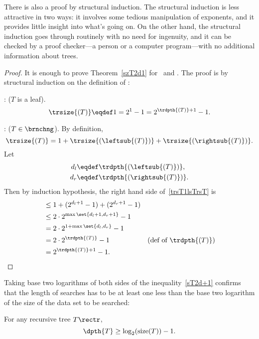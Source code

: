 \begin{definition}
There is also a proof by structural induction.  The structural
induction is less attractive in two ways: it involves some tedious
manipulation of exponents, and it provides little insight into what's
going on.  On the other hand, the structural induction goes through
routinely with no need for ingenuity, and it can be checked by a proof
checker---a person or a computer program---with no additional
information about trees.

\begin{proof} 
It is enough to prove Theorem~\ref{szT2d1} for \trsize\ and \trdpth.
The proof is by structural induction on the definition of \rectr:

: ($T$ is a leaf).
\[
\trsize{(T)} \eqdef 1 = 2^1 - 1 = 2^{\trdpth{(T)}+1} - 1.
\]

: ($T \in \brnchng$).
By definition,
\begin{equation}\label{trsT1lsTrsT}
\trsize{(T)} = 1 + \trsize{(\leftsub{(T)})} + \trsize{(\rightsub{(T)})}.
\end{equation}
Let
\begin{align*}
d_l & \eqdef \trdpth{(\leftsub{(T)})},\\
d_r & \eqdef \trdpth{(\rightsub{(T)})}.
\end{align*}
Then by induction hypothesis, the right hand side of~\eqref{trsT1lsTrsT} is
\begin{align*}
& \leq 1 + (2^{d_l+1} -1)  + (2^{d_r+1} -1)\\
& \leq  2\cdot 2^{\max\set{d_l+1,d_r+1}} - 1\\
& = 2\cdot 2^{1+\max\set{d_l,d_r}} - 1\\
& = 2\cdot 2^{\trdpth{(T)}} - 1
              & \text{(def of $\trdpth{(T)}$)}\\
& =  2^{\trdpth{(T)}+1} - 1.
\end{align*}
\end{proof}

Taking base two logarithms of both sides of the
inequality~\eqref{sT2d+1} confirms that the length of searches has to
be at least one less than the base two logarithm of the size of the
data set to be searched:

\begin{corollary}
For any recursive tree $T \rectr$,
\begin{equation}\label{}
\dpth{T} \geq \log_2(\text{size}(T)) - 1.
\end{equation}
\end{corollary}


\end{definition}
